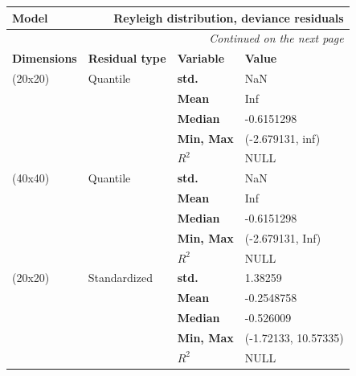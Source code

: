 \documentclass[12pt,a4paper,twoside]{article}
\begin{document}
\begin{longtable}{l|p{}|p{}|p{}}
	\textbf{Model} & \multicolumn{3}{r}{Reyleigh distribution, deviance residuals} \\
	\hline
	\endhead
	\hline
	\multicolumn{4}{r}{\emph{Continued on the next page}} \\
	\endfoot
	\hline
	\endlastfoot
	\hline
	\textbf{Dimensions} & \textbf{Residual type} & \textbf{Variable}      & \textbf{Value}         \\
    (20x20)             & Quantile               & \textbf{std.}          &  NaN                   \\
                        &                        & \textbf{Mean}          &  Inf                   \\
                        &                        & \textbf{Median}        & -0.6151298             \\
                        &                        & \textbf{Min, Max}      & (-2.679131, inf)       \\
                        &                        & \textbf{$R^2$}         &  NULL                  \\
    \hline
    (40x40)             & Quantile               & \textbf{std.}          &  NaN                   \\
                        &                        & \textbf{Mean}          &  Inf                   \\
                        &                        & \textbf{Median}        & -0.6151298             \\
                        &                        & \textbf{Min, Max}      & (-2.679131, Inf)       \\
                        &                        & \textbf{$R^2$}         &  NULL                  \\
    \hline
    (20x20)             & Standardized           & \textbf{std.}          &  1.38259               \\
                        &                        & \textbf{Mean}          & -0.2548758             \\
                        &                        & \textbf{Median}        & -0.526009              \\
                        &                        & \textbf{Min, Max}      & (-1.72133, 10.57335)   \\
                        &                        & \textbf{$R^2$}         & NULL                   \\

\end{longtable}
\end{document}
